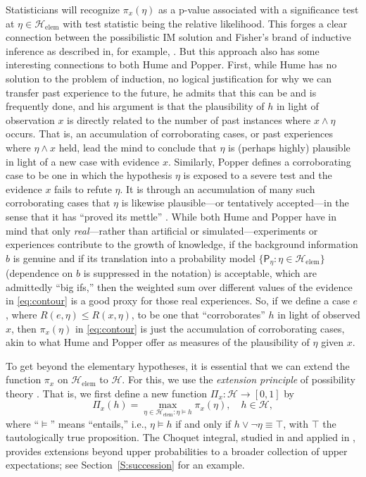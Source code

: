 \documentclass[a4paper, 12pt]{article}
\theoremstyle{plain}
\theoremstyle{definition}
\theoremstyle{remark}
\newcommand{\prob}{\mathsf{P}}
\renewcommand{\H}{\mathcal{H}}
\newcommand{\uPi}{\mathsf{\Pi}}%
\begin{document}
Statisticians will recognize $\pi_x(\eta)$ as a p-value associated with a significance test at $\eta \in \H_\text{elem}$ with test statistic being the relative likelihood.  This forges a clear connection between the possibilistic IM solution and Fisher's brand of inductive inference as described in, for example, \citet{fisher1973}.  But this approach also has some interesting connections to both Hume and Popper.  First, while Hume has no solution to the problem of induction, no logical justification for why we can transfer past experience to the future, he admits that this can be and is frequently done, and his argument \citep[][Sec.~6]{hume.enquiry} is that the plausibility of $h$ in light of observation $x$ is directly related to the number of past instances where $x \land \eta$ occurs. That is, an accumulation of corroborating cases, or past experiences where $\eta \land x$ held, lead the mind to conclude that $\eta$ is (perhaps highly) plausible in light of a new case with evidence $x$.  Similarly, Popper defines a corroborating case to be one in which the hypothesis $\eta$ is exposed to a severe test and the evidence $x$ fails to refute $\eta$.  It is through an accumulation of many such corroborating cases that $\eta$ is likewise plausible---or tentatively accepted---in the sense that it has ``proved its mettle'' \citep[][p.~10]{popper1959}.  While both Hume and Popper have in mind that only {\em real}---rather than artificial or simulated---experiments or experiences contribute to the growth of knowledge, if the background information $b$ is genuine and if its translation into a probability model $\{\prob_\eta: \eta \in \H_\text{elem}\}$ (dependence on $b$ is suppressed in the notation) is acceptable, which are admittedly ``big ifs,'' then the weighted sum over different values of the evidence in \eqref{eq:contour} is a good proxy for those real experiences.  So, if we define a case $e$, where $R(e,\eta) \leq R(x,\eta)$, to be one that ``corroborates'' $h$ in light of observed $x$, then $\pi_x(\eta)$ in \eqref{eq:contour} is just the accumulation of corroborating cases, akin to what Hume and Popper offer as measures of the plausibility of $\eta$ given $x$.  

To get beyond the elementary hypotheses, it is essential that we can extend the function $\pi_x$ on $\H_\text{elem}$ to $\H$.  For this, we use the {\em extension principle} of possibility theory \citep[e.g.,][]{zadeh1975a}.  That is, we first define a new function $\uPi_x: \H \to [0,1]$ by 
\begin{equation}
\label{eq:upper}
\uPi_x(h) = \max_{\eta \in \H_\text{elem}: \eta \models h} \pi_x(\eta), \quad h \in \H, 
\end{equation}
where ``$\models$'' means ``entails,'' i.e., $\eta \models h$ if and only if $h \lor \neg\eta \equiv \top$, with $\top$ the tautologically true proposition.  The Choquet integral, studied in \citet{lower.previsions.book} and applied in \citet{imdec.ext}, provides extensions beyond upper probabilities to a broader collection of upper expectations; see Section~\ref{S:succession} for an example. 
\end{document}
